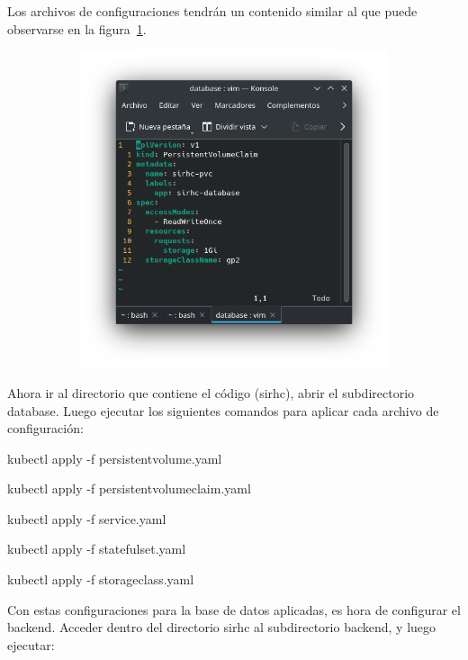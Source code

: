 \documentclass{article}
\begin{document}
Los archivos de configuraciones tendrán un contenido similar al que puede observarse en la figura~\ref{fig:configuracionKubernetes}.
\begin{figure}[H]
	\caption{Contenido de un archivo de configuración de kubernetes}
    \begin{subfigure}{1\textwidth}
	\includegraphics[width=1\textwidth]{configuracionKubernetesEjemplo.png}
    \end{subfigure}
	\label{fig:configuracionKubernetes}
\end{figure}
\vspace{-1.0\baselineskip}

Ahora ir al directorio que contiene el código (sirhc), abrir el subdirectorio database. Luego ejecutar los siguientes comandos para aplicar cada archivo de configuración:

kubectl apply -f persistentvolume.yaml

kubectl apply -f persistentvolumeclaim.yaml

kubectl apply -f service.yaml

kubectl apply -f statefulset.yaml

kubectl apply -f storageclass.yaml

Con estas configuraciones para la base de datos aplicadas, es hora de configurar el backend. Acceder dentro del directorio sirhc al subdirectorio backend, y luego ejecutar:
\end{document}
